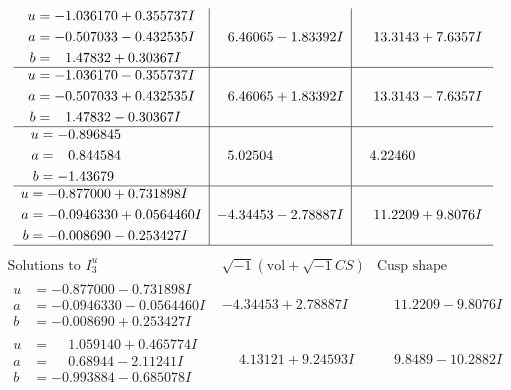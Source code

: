 \documentclass[1p]{elsarticle_modified}
\theoremstyle{definition}
\newcommand{\I}{\sqrt{-1}}
\begin{document}
$$\begin{array}{c|c|c}
\begin{aligned}
u &= -1.036170 + 0.355737 I \\
a &= -0.507033 - 0.432535 I \\
b &= \phantom{-}1.47832 + 0.30367 I\end{aligned}
 & \phantom{-}6.46065 - 1.83392 I & \phantom{-}13.3143 + 7.6357 I \\ \hline\begin{aligned}
u &= -1.036170 - 0.355737 I \\
a &= -0.507033 + 0.432535 I \\
b &= \phantom{-}1.47832 - 0.30367 I\end{aligned}
 & \phantom{-}6.46065 + 1.83392 I & \phantom{-}13.3143 - 7.6357 I \\ \hline\begin{aligned}
u &= -0.896845\phantom{ +0.000000I} \\
a &= \phantom{-}0.844584\phantom{ +0.000000I} \\
b &= -1.43679\phantom{ +0.000000I}\end{aligned}
 & \phantom{-}5.02504\phantom{ +0.000000I} & \phantom{-}4.22460\phantom{ +0.000000I} \\ \hline\begin{aligned}
u &= -0.877000 + 0.731898 I \\
a &= -0.0946330 + 0.0564460 I \\
b &= -0.008690 - 0.253427 I\end{aligned}
 & -4.34453 - 2.78887 I & \phantom{-}11.2209 + 9.8076 I\\
 \hline 
 \end{array}$$\newpage$$\begin{array}{c|c|c}  
\text{Solutions to }I^u_{3}& \I (\text{vol} + \sqrt{-1}CS) & \text{Cusp shape}\\
 \hline 
\begin{aligned}
u &= -0.877000 - 0.731898 I \\
a &= -0.0946330 - 0.0564460 I \\
b &= -0.008690 + 0.253427 I\end{aligned}
 & -4.34453 + 2.78887 I & \phantom{-}11.2209 - 9.8076 I \\ \hline\begin{aligned}
u &= \phantom{-}1.059140 + 0.465774 I \\
a &= \phantom{-}0.68944 - 2.11241 I \\
b &= -0.993884 - 0.685078 I\end{aligned}
 & \phantom{-}4.13121 + 9.24593 I & \phantom{-}9.8489 - 10.2882 I \\ \hline\begin{aligned}

\end{aligned}
\end{array}$$
\end{document}
